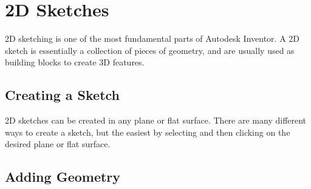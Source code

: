 \section{2D Sketches}

2D sketching is one of the most fundamental parts of Autodesk Inventor. A 2D sketch is essentially a collection of pieces of geometry, and are usually used as building blocks to create 3D features.

\subsection{Creating a Sketch}

2D sketches can be created in any plane or flat surface. There are many different ways to create a sketch, but the easiest by selecting  and then clicking on the desired plane or flat surface.

\subsection{Adding Geometry}

$ $

